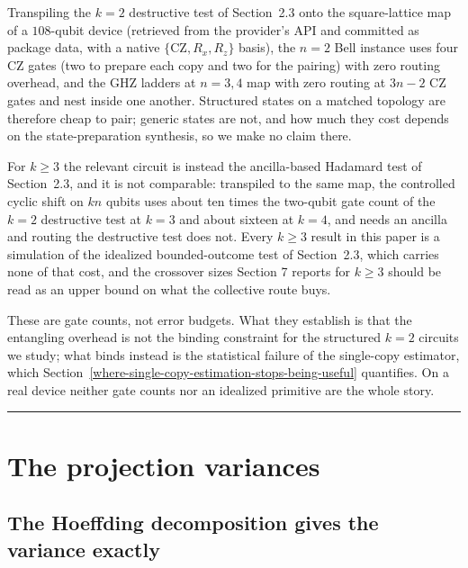 \documentclass[a4paper,superscriptaddress,nofootinbib,onecolumn,nopdfoutputerror]{quantumarticle}
\begin{document}
Transpiling the \(k = 2\) destructive test of Section~2.3 onto the square-lattice map of a
\(108\)-qubit device (retrieved from the provider's API and committed as package data, with a
native \(\{\mathrm{CZ}, R_x, R_z\}\) basis), the \(n = 2\) Bell instance uses four CZ
gates (two to
prepare each copy and two for the pairing) with zero routing overhead, and the GHZ ladders at
\(n = 3, 4\) map with zero routing at \(3n - 2\) CZ gates and nest inside one another. Structured
states on a matched topology are therefore cheap to pair; generic states are not, and how much
they cost depends on the state-preparation synthesis, so we make no claim there.

For \(k \ge 3\) the relevant circuit is instead the ancilla-based Hadamard test of
Section~2.3, and it is not comparable: transpiled to the same map, the controlled cyclic shift on
\(kn\) qubits uses about ten times the two-qubit gate count of the \(k = 2\) destructive test at
\(k = 3\) and about sixteen at \(k = 4\), and needs an ancilla and routing the destructive test
does not. Every \(k \ge 3\) result in this paper is a simulation of the idealized bounded-outcome test
of Section~2.3, which carries none of that cost, and the crossover sizes Section 7 reports for \(k \ge 3\) should be read as an upper bound on
what the collective route buys.

These are gate counts, not error budgets. What they establish is that the entangling overhead is
not the binding constraint for the structured \(k = 2\) circuits we study; what binds instead is
the statistical failure of the single-copy estimator, which
Section~\ref{where-single-copy-estimation-stops-being-useful} quantifies. On a real device
neither gate counts nor an idealized primitive are the whole story.

\begin{center}\rule{0.5\linewidth}{0.5pt}\end{center}

\hypertarget{the-single-copy-variance-law}{%
\section{The projection variances}\label{the-single-copy-variance-law}}

\hypertarget{the-hoeffding-decomposition-gives-the-variance-exactly}{%
\subsection{The Hoeffding decomposition gives the variance
exactly}\label{the-hoeffding-decomposition-gives-the-variance-exactly}}
\end{document}
